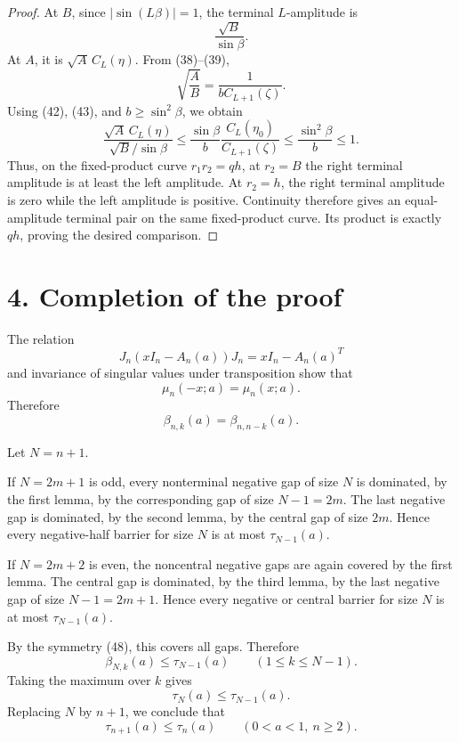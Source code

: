 \documentclass[11pt]{article}
\begin{document}
\begin{proof}
At \(B\), since \(|\sin(L\beta)|=1\), the terminal \(L\)-amplitude is
\[
\frac{\sqrt B}{\sin\beta}.
\]
At \(A\), it is \(\sqrt A\,C_L(\eta)\). From (38)--(39),
\[
\sqrt{\frac AB}
 =\frac1{bC_{L+1}(\zeta)}.
\]
Using (42), (43), and \(b\geq\sin^2\beta\), we obtain
\[
\frac{\sqrt A\,C_L(\eta)}
     {\sqrt B/\sin\beta}
 \leq
 \frac{\sin\beta}{b}
 \frac{C_L(\eta_0)}{C_{L+1}(\zeta)}
 \leq\frac{\sin^2\beta}{b}
 \leq1.
\tag{46}
\]
Thus, on the fixed-product curve \(r_1r_2=qh\), at \(r_2=B\) the right
terminal amplitude is at least the left amplitude. At \(r_2=h\), the right
terminal amplitude is zero while the left amplitude is positive.
Continuity therefore gives an equal-amplitude terminal pair on the same
fixed-product curve. Its product is exactly \(qh\), proving the desired
comparison.
\end{proof}

\section*{4. Completion of the proof}

The relation
\[
J_n(xI_n-A_n(a))J_n=xI_n-A_n(a)^T
\]
and invariance of singular values under transposition show that
\[
\mu_n(-x;a)=\mu_n(x;a).
\tag{47}
\]
Therefore
\[
\beta_{n,k}(a)=\beta_{n,n-k}(a).
\tag{48}
\]

Let \(N=n+1\).

If \(N=2m+1\) is odd, every nonterminal negative gap of size \(N\) is
dominated, by the first lemma, by the corresponding gap of size \(N-1=2m\).
The last negative gap is dominated, by the second lemma, by the central gap
of size \(2m\). Hence every negative-half barrier for size \(N\) is at most
\(\tau_{N-1}(a)\).

If \(N=2m+2\) is even, the noncentral negative gaps are again covered by the
first lemma. The central gap is dominated, by the third lemma, by the last
negative gap of size \(N-1=2m+1\). Hence every negative or central barrier for
size \(N\) is at most \(\tau_{N-1}(a)\).

By the symmetry (48), this covers all gaps. Therefore
\[
\beta_{N,k}(a)\leq\tau_{N-1}(a)
\qquad(1\leq k\leq N-1).
\]
Taking the maximum over \(k\) gives
\[
\tau_N(a)\leq\tau_{N-1}(a).
\]
Replacing \(N\) by \(n+1\), we conclude that
\[
\boxed{\tau_{n+1}(a)\leq\tau_n(a)}
\qquad
(0<a<1,\ n\geq2).
\]
\end{document}
